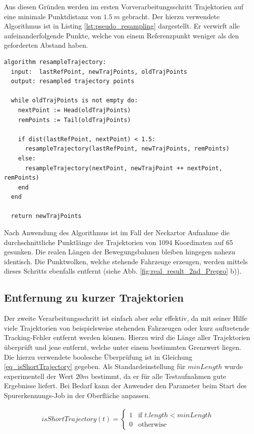 Aus diesen Gründen werden im ersten Vorverarbeitungsschritt Trajektorien auf eine minimale Punktdistanz
von $1.5\ m$ gebracht. Der hierzu verwendete Algorithmus ist in Listing \ref{lst:pseudo_resampling} dargestellt.
Er verwirft alle aufeinanderfolgende Punkte, welche von einem Referenzpunkt weniger als den geforderten Abstand haben.
\begin{lstlisting}[caption=Pseudocode Trajektorie Resampling, language=Pseudo, label=lst:pseudo_resampling]
algorithm resampleTrajectory:
  input:  lastRefPoint, newTrajPoints, oldTrajPoints
  output: resampled trajectory points

  while oldTrajPoints is not empty do:
    nextPoint := Head(oldTrajPoints)
    remPoints := Tail(oldTrajPoints)

    if dist(lastRefPoint, nextPoint) < 1.5:
      resampleTrajectory(lastRefPoint, newTrajPoints, remPoints)
    else:
      resampleTrajectory(nextPoint, newTrajPoint ++ nextPoint, remPoints)
    end
  end

  return newTrajPoints
\end{lstlisting}

Nach Anwendung des Algorithmus ist im Fall der Neckartor Aufnahme die durchschnittliche Punktlänge
der Trajektorien von 1094 Koordinaten auf 65 gesunken. Die realen Längen der Bewegungsbahnen bleiben
hingegen nahezu identisch. Die Punktwolken, welche stehende Fahrzeuge erzeugen, werden mittels dieses
Schritts ebenfalls entfernt (siehe Abb. \ref{fig:real_result_2nd_Prepro} b)).

\subsection{Entfernung zu kurzer Trajektorien}
Der zweite Verarbeitungsschritt ist einfach aber sehr effektiv, da mit seiner Hilfe viele
Trajektorien von beispielsweise stehenden Fahrzeugen oder kurz auftretende Tracking-Fehler entfernt
werden können. Hierzu wird die Länge aller Trajektorien überprüft und jene entfernt, welche
unter einem bestimmten Grenzwert liegen. Die hierzu verwendete boolesche Überprüfung ist in Gleichung
\ref{eq_isShortTrajectory} gegeben.
Als Standardeinstellung für $minLength$ wurde experimentell der Wert $20m$ bestimmt, da er für alle
Testaufnahmen gute Ergebnisse liefert. Bei Bedarf kann der Anwender den Parameter beim Start des Spurerkennungs-Job
in der Oberfläche anpassen.

\begin{ceqn}
\begin{align}
\label{eq_isShortTrajectory}
    isShortTrajectory(t) =
    \begin{cases}
        1 & \text{if } t.length < minLength \\
        0 & \text{otherwise}
    \end{cases}
\end{align}
\end{ceqn}

